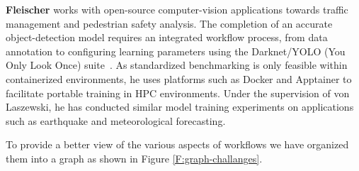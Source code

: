 {\bf Fleischer} works with open-source computer-vision applications towards traffic management and pedestrian safety analysis. The completion of an accurate object-detection model requires an integrated workflow process, from data annotation to configuring learning parameters using the Darknet/YOLO (You Only Look Once) suite~\citep{charette_2022, bochkovskiy2020yolov4optimalspeedaccuracy}. As standardized benchmarking is only feasible within containerized environments, he uses platforms such as Docker and Apptainer to facilitate portable training in HPC environments. Under the supervision of von Laszewski, he has conducted similar model training experiments on applications such as earthquake and meteorological forecasting.



To provide a better view of the various aspects of workflows we have organized them into a graph as shown in Figure \ref{F:graph-challanges}.





% 
\newpage


